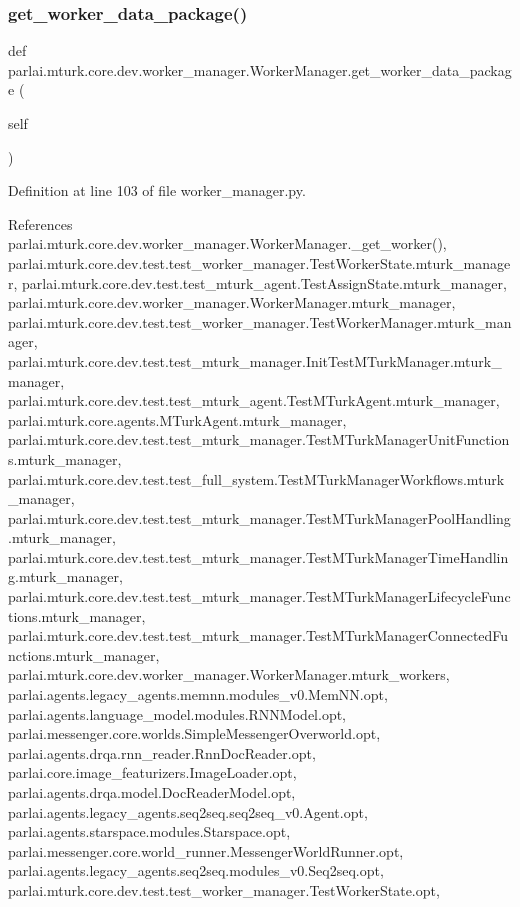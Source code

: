 \subsubsection{\texorpdfstring{get\+\_\+worker\+\_\+data\+\_\+package()}{get\_worker\_data\_package()}}
{\footnotesize\ttfamily def parlai.\+mturk.\+core.\+dev.\+worker\+\_\+manager.\+Worker\+Manager.\+get\+\_\+worker\+\_\+data\+\_\+package (\begin{DoxyParamCaption}\item[{}]{self }\end{DoxyParamCaption})}



Definition at line 103 of file worker\+\_\+manager.\+py.



References parlai.\+mturk.\+core.\+dev.\+worker\+\_\+manager.\+Worker\+Manager.\+\_\+get\+\_\+worker(), parlai.\+mturk.\+core.\+dev.\+test.\+test\+\_\+worker\+\_\+manager.\+Test\+Worker\+State.\+mturk\+\_\+manager, parlai.\+mturk.\+core.\+dev.\+test.\+test\+\_\+mturk\+\_\+agent.\+Test\+Assign\+State.\+mturk\+\_\+manager, parlai.\+mturk.\+core.\+dev.\+worker\+\_\+manager.\+Worker\+Manager.\+mturk\+\_\+manager, parlai.\+mturk.\+core.\+dev.\+test.\+test\+\_\+worker\+\_\+manager.\+Test\+Worker\+Manager.\+mturk\+\_\+manager, parlai.\+mturk.\+core.\+dev.\+test.\+test\+\_\+mturk\+\_\+manager.\+Init\+Test\+M\+Turk\+Manager.\+mturk\+\_\+manager, parlai.\+mturk.\+core.\+dev.\+test.\+test\+\_\+mturk\+\_\+agent.\+Test\+M\+Turk\+Agent.\+mturk\+\_\+manager, parlai.\+mturk.\+core.\+agents.\+M\+Turk\+Agent.\+mturk\+\_\+manager, parlai.\+mturk.\+core.\+dev.\+test.\+test\+\_\+mturk\+\_\+manager.\+Test\+M\+Turk\+Manager\+Unit\+Functions.\+mturk\+\_\+manager, parlai.\+mturk.\+core.\+dev.\+test.\+test\+\_\+full\+\_\+system.\+Test\+M\+Turk\+Manager\+Workflows.\+mturk\+\_\+manager, parlai.\+mturk.\+core.\+dev.\+test.\+test\+\_\+mturk\+\_\+manager.\+Test\+M\+Turk\+Manager\+Pool\+Handling.\+mturk\+\_\+manager, parlai.\+mturk.\+core.\+dev.\+test.\+test\+\_\+mturk\+\_\+manager.\+Test\+M\+Turk\+Manager\+Time\+Handling.\+mturk\+\_\+manager, parlai.\+mturk.\+core.\+dev.\+test.\+test\+\_\+mturk\+\_\+manager.\+Test\+M\+Turk\+Manager\+Lifecycle\+Functions.\+mturk\+\_\+manager, parlai.\+mturk.\+core.\+dev.\+test.\+test\+\_\+mturk\+\_\+manager.\+Test\+M\+Turk\+Manager\+Connected\+Functions.\+mturk\+\_\+manager, parlai.\+mturk.\+core.\+dev.\+worker\+\_\+manager.\+Worker\+Manager.\+mturk\+\_\+workers, parlai.\+agents.\+legacy\+\_\+agents.\+memnn.\+modules\+\_\+v0.\+Mem\+N\+N.\+opt, parlai.\+agents.\+language\+\_\+model.\+modules.\+R\+N\+N\+Model.\+opt, parlai.\+messenger.\+core.\+worlds.\+Simple\+Messenger\+Overworld.\+opt, parlai.\+agents.\+drqa.\+rnn\+\_\+reader.\+Rnn\+Doc\+Reader.\+opt, parlai.\+core.\+image\+\_\+featurizers.\+Image\+Loader.\+opt, parlai.\+agents.\+drqa.\+model.\+Doc\+Reader\+Model.\+opt, parlai.\+agents.\+legacy\+\_\+agents.\+seq2seq.\+seq2seq\+\_\+v0.\+Agent.\+opt, parlai.\+agents.\+starspace.\+modules.\+Starspace.\+opt, parlai.\+messenger.\+core.\+world\+\_\+runner.\+Messenger\+World\+Runner.\+opt, parlai.\+agents.\+legacy\+\_\+agents.\+seq2seq.\+modules\+\_\+v0.\+Seq2seq.\+opt, parlai.\+mturk.\+core.\+dev.\+test.\+test\+\_\+worker\+\_\+manager.\+Test\+Worker\+State.\+opt, 